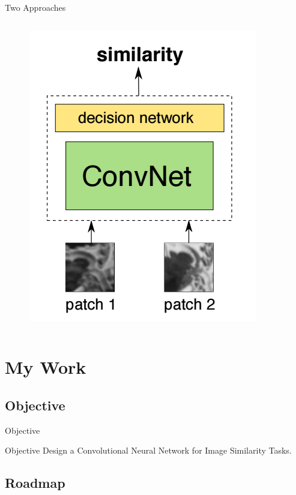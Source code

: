\documentclass{beamer}
\begin{document}
\begin{frame}{Two Approaches}
\begin{columns}[c]
          \begin{figure}
            \par\medskip
            \includegraphics[scale=0.28]{images/slides/cnn2}
          \end{figure}

      \end{columns}
    \end{frame}

\section{My Work}

  \subsection{Objective}

  \begin{frame}{Objective}

    \begin{block}{Objective}
    Design a Convolutional Neural Network for Image Similarity Tasks.
    \end{block}

  \end{frame}

  \subsection{Roadmap}
\end{document}
